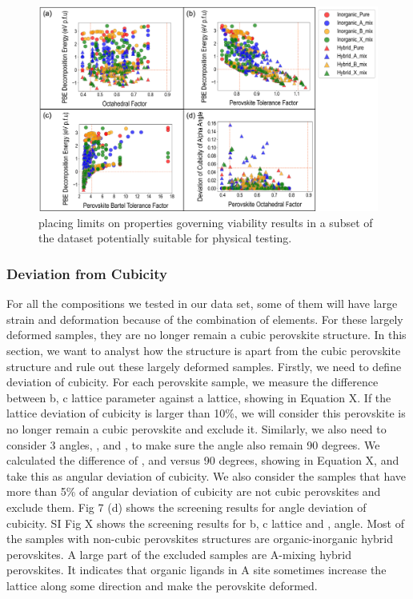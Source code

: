 \documentclass[twoside, twocolumn, 9pt, draft]{article}
\begin{document}
\begin{figure}
\centering
\includegraphics[width=.9\linewidth]{Figure6.png}
\caption{\label{fig:cuts} placing limits on properties governing viability results in a subset of the dataset potentially suitable for physical testing.}
\end{figure}

\subsubsection*{Deviation from Cubicity}
\label{sec:org65cdfae}
For all the compositions we tested in our data set, some of them will
have large strain and deformation because of the combination of
elements. For these largely deformed samples, they are no longer remain
a cubic perovskite structure. In this section, we want to analyst how
the structure is apart from the cubic perovskite structure and rule out
these largely deformed samples. Firstly, we need to define deviation of
cubicity. For each perovskite sample, we measure the difference between
b, c lattice parameter against a lattice, showing in Equation X. If the
lattice deviation of cubicity is larger than 10\%, we will consider this
perovskite is no longer remain a cubic perovskite and exclude it.
Similarly, we also need to consider 3 angles, , and , to make sure the
angle also remain 90 degrees. We calculated the difference of , and
versus 90 degrees, showing in Equation X, and take this as angular
deviation of cubicity. We also consider the samples that have more than
5\% of angular deviation of cubicity are not cubic perovskites and
exclude them. Fig 7 (d) shows the screening results for angle deviation
of cubicity. SI Fig X shows the screening results for b, c lattice and ,
angle. Most of the samples with non-cubic perovskites structures are
organic-inorganic hybrid perovskites. A large part of the excluded
samples are A-mixing hybrid perovskites. It indicates that organic
ligands in A site sometimes increase the lattice along some direction
and make the perovskite deformed.
\end{document}

